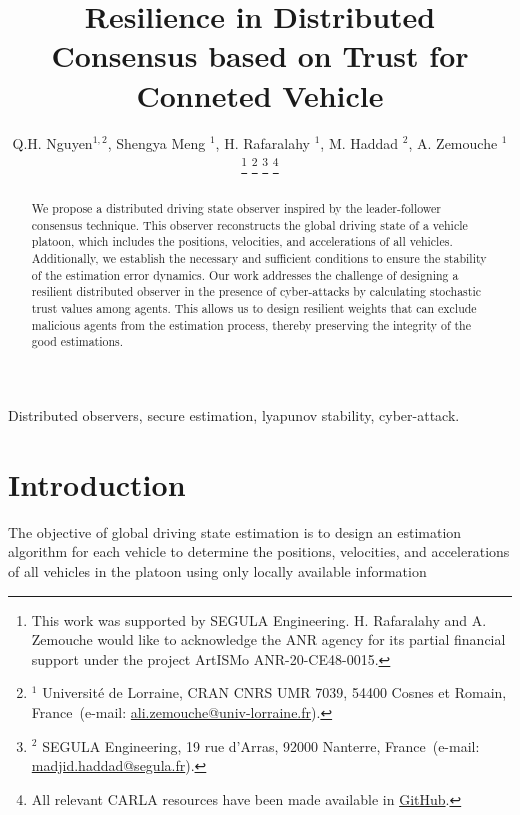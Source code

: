 \documentclass[letterpaper, 10pt, conference]{ieeeconf}  %
\begin{document}
\title{\bf Resilience in Distributed
 Consensus based on Trust for Conneted Vehicle }
\author{Q.H. Nguyen$^{1,2}$, Shengya Meng $^{1}$, H. Rafaralahy $^{1}$, M. Haddad $^{2}$, A. Zemouche $^{1}$
%
\thanks{This work was supported by SEGULA Engineering. H. Rafaralahy and A. Zemouche would like to acknowledge the ANR agency for its partial financial support under the project ArtISMo ANR-20-CE48-0015.
}
%
\thanks{$^{1}$ Universit\'e de Lorraine, CRAN  CNRS UMR 7039, 54400 Cosnes et Romain, France~(e-mail: \protect\url{ali.zemouche@univ-lorraine.fr}).}
%
\thanks{$^{2}$ SEGULA Engineering, 19 rue d'Arras, 92000 Nanterre, France~(e-mail: \protect\url{madjid.haddad@segula.fr}).}
%
\thanks{All relevant CARLA resources have been made available in \protect\href{https://github.com/kslhuy/CACC_UIO_simulink}{GitHub}.}
}
\maketitle

\begin{abstract}
We propose a distributed driving state observer inspired by the leader-follower consensus technique. This observer reconstructs the global driving state of a vehicle platoon, which includes the positions, velocities, and accelerations of all vehicles. Additionally, we establish the necessary and sufficient conditions to ensure the stability of the estimation error dynamics. Our work addresses the challenge of designing a resilient distributed observer in the presence of cyber-attacks by calculating stochastic trust values among agents. This allows us to design resilient weights that can exclude malicious agents from the estimation process, thereby preserving the integrity of the good estimations.
\end{abstract}

\begin{keywords}
Distributed observers, secure estimation, lyapunov stability, cyber-attack.
\end{keywords}

\section{Introduction}

 The objective of global driving state
 estimation is to design an estimation algorithm for each vehicle
 to determine the positions, velocities, and accelerations of all
 vehicles in the platoon using only locally available information
\end{document}

